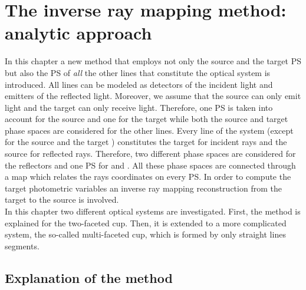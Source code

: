 \chapter{The inverse ray mapping method: analytic approach}\label{chap:raymapping1}
In this chapter a new method that employs not only the source and the target PS but also the PS of \textit{all} the other lines that constitute the optical system is introduced. %
All lines can be modeled as detectors of the incident light and emitters of the reflected light.
Moreover, we assume that the source can only emit light and the target can only receive light.
Therefore, one PS is taken into account for the source and one for the target while both the source and target phase spaces are considered for the other lines. Every line of the system (except for the source  and the target ) constitutes
the target for incident rays and the source for reflected rays. Therefore, two different phase spaces are considered for the reflectors and one PS for
 and . All these phase spaces are connected through a map which relates the rays coordinates on every PS. In order to compute the target photometric variables an inverse ray mapping reconstruction from the target to the source is involved.
\\\indent
In this chapter two different optical systems are investigated.
First, the method is explained for the two-faceted cup. 
Then, it is extended to a more complicated system, the so-called multi-faceted cup, which is formed by only straight lines segments.
\section{Explanation of the method}

